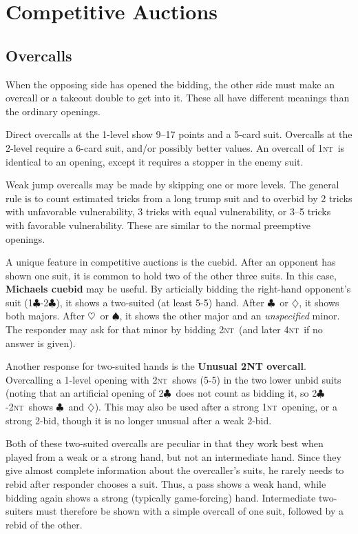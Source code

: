 \documentclass[11pt]{article}
\def\C{$\clubsuit$}
\def\D{$\diamondsuit$}
\def\H{$\heartsuit$}
\def\S{$\spadesuit$}
\def\NT{\textsc{nt}}
\begin{document}
\section{Competitive Auctions}

\subsection{Overcalls}
When the opposing side has opened the bidding, the other side
must make an overcall or a takeout double to get into it.  These
all have different meanings than the ordinary openings.

Direct overcalls at the 1-level show 9--17 points and a 5-card suit.
Overcalls at the 2-level require a 6-card suit, and/or possibly better
values.  An overcall of 1\NT\ is identical to an opening, except it
requires a stopper in the enemy suit.

Weak jump overcalls may be made by skipping one or more levels.
The general rule is to count estimated tricks from a long trump
suit and to overbid by 2 tricks with unfavorable vulnerability,
3 tricks with equal vulnerability, or 3--5 tricks with
favorable vulnerability.  These are similar to the normal
preemptive openings.

A unique feature in competitive auctions is the cuebid.  After an
opponent has shown one suit, it is common to hold two of the
other three suits.  In this case, \textbf{Michaels cuebid} may be useful.
By articially bidding the right-hand opponent's suit (1\C-2\C),
it shows a two-suited (at least 5-5) hand.  After \C\ or \D,
it shows both majors.  After \H\ or \S, it shows the other
major and an \emph{unspecified} minor.  The responder may ask
for that minor by bidding 2\NT\ (and later 4\NT\ if no answer is
given).

Another response for two-suited hands is the \textbf{Unusual 2NT overcall}.
Overcalling a 1-level opening with 2\NT\ shows (5-5) in the two lower unbid
suits (noting that an artificial opening of 2\C\ does not count as bidding
it, so 2\C-2\NT\ shows \C\ and \D).  This may also be used after a strong 
1\NT\ opening, or a strong 2-bid, though it is no longer unusual after a
weak 2-bid.

Both of these two-suited overcalls are peculiar in that they work
best when played from a weak or a strong hand, but not an intermediate
hand.  Since they give almost complete information about the overcaller's
suits, he rarely needs to rebid after responder chooses a suit.  Thus,
a pass shows a weak hand, while bidding again shows a strong (typically
game-forcing) hand.  Intermediate two-suiters must therefore be shown
with a simple overcall of one suit, followed by a rebid of the other.
\end{document}
